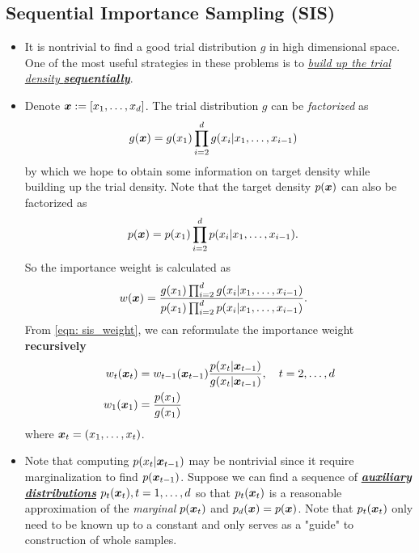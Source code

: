 \documentclass[11pt]{article}
\begin{document}
\subsection{Sequential Importance Sampling (SIS)}
\begin{itemize}
\item It is nontrivial to find a good trial distribution $g$ in high dimensional space. One of the most useful strategies in these problems is to \underline{\emph{build up the trial density} \emph{\textbf{sequentially}}}.

\item Denote $\boldsymbol{x} := [x_1, \ldots, x_{d}]$. The trial distribution $g$ can be \emph{factorized} as 
\begin{align*}
g(\boldsymbol{x}) &= g(x_1)\prod_{i=2}^{d}g(x_{i}| x_1, \ldots, x_{i-1})
\end{align*} by which we hope to obtain some information on target density while building up the trial density. Note that the target density $p(\boldsymbol{x})$  can also be factorized as
\begin{align*}
p(\boldsymbol{x}) &= p(x_1)\prod_{i=2}^{d}p(x_{i}| x_1, \ldots, x_{i-1}).
\end{align*} So the importance weight is calculated as 
\begin{align}
w(\boldsymbol{x}) &= \frac{g(x_1)\prod_{i=2}^{d}g(x_{i}| x_1, \ldots, x_{i-1})}{p(x_1)\prod_{i=2}^{d}p(x_{i}| x_1, \ldots, x_{i-1})}. \label{eqn: sis_weight}
\end{align} From \eqref{eqn: sis_weight}, we can reformulate the importance weight \textbf{recursively}
\begin{align}
w_{t}(\boldsymbol{x}_{t}) &=w_{t-1}(\boldsymbol{x}_{t-1})\frac{p(x_{t}| \boldsymbol{x}_{t-1})}{g(x_{t}| \boldsymbol{x}_{t-1})}, \quad t=2,\ldots, d   \label{eqn: sis_weight_update}\\
w_{1}(\boldsymbol{x}_{1}) &= \frac{p(x_1)}{g(x_1)} \nonumber
\end{align} where $\boldsymbol{x}_{t} = (x_1, \ldots, x_t)$. 

\item Note that computing $p(x_{t}| \boldsymbol{x}_{t-1})$ may be nontrivial since it require marginalization to find $p(\boldsymbol{x}_{t-1})$. Suppose we can find a sequence of \underline{\textbf{\emph{auxiliary distributions}}} $p_t(\boldsymbol{x}_{t}), t=1,\ldots, d$ so that $p_t(\boldsymbol{x}_{t})$ is a reasonable approximation of the \emph{marginal} $p(\boldsymbol{x}_{t})$ and $p_d(\boldsymbol{x}) = p(\boldsymbol{x})$. Note that $p_t(\boldsymbol{x}_{t})$ only need to be known up to a constant and only serves as a "guide" to construction of whole samples. 


\end{itemize}
\end{document}
